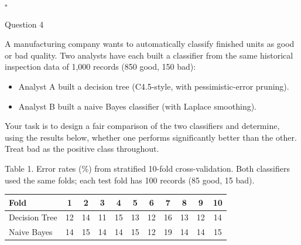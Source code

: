 \documentclass[12pt,letterpaper, onecolumn]{exam}
\begin{document}
\begin{questions}
\begin{solution}
        $\square$
    \end{solution}

    \newpage
    \question[30] Question 4\droppoints

    A manufacturing company wants to automatically classify finished units as good or bad quality. Two analysts have each built a classifier from the same historical inspection data of 1,000 records (850 good, 150 bad):
    \begin{itemize}
        \item Analyst A built a decision tree (C4.5-style, with pessimistic-error pruning).
        \item Analyst B built a naive Bayes classifier (with Laplace smoothing).
    \end{itemize}

    Your task is to design a fair comparison of the two classifiers and determine, using the results below, whether one performs significantly better than the other. Treat bad as the positive class throughout.

    Table 1. Error rates (\%) from stratified 10-fold cross-validation. Both classifiers used the same folds; each test fold has 100 records (85 good, 15 bad).
    {\small
        \begin{longtable}{|l|c|c|c|c|c|c|c|c|c|c|}
            \hline Fold & 1 & 2 & 3 & 4 & 5 & 6 & 7 & 8 & 9 & 10 \\ \hline
            \endhead
            \hline
            \endfoot
            Decision Tree & 12 & 14 & 11 & 15 & 13 & 12 & 16 & 13 & 12 & 14 \\
            Naive Bayes & 14 & 15 & 14 & 14 & 15 & 12 & 19 & 14 & 14 & 15
        \end{longtable}
        }


\end{questions}
\end{document}
